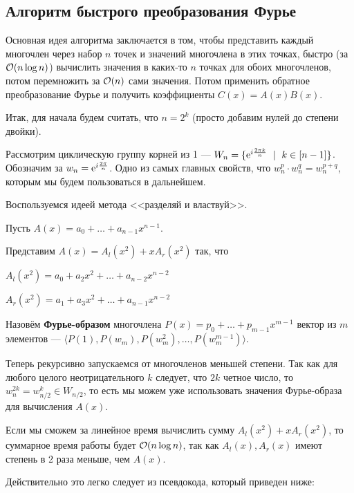 \subsection{Алгоритм быстрого преобразования Фурье}

Основная идея алгоритма заключается в том, чтобы представить каждый многочлен
через набор $n$ точек и значений многочлена в этих точках, быстро (за $\mathcal{O}(n\log n)$) вычислить значения в каких-то $n$ точках для обоих многочленов, потом
перемножить за $\mathcal{O}(n)$ сами значения. Потом применить обратное преобразование
Фурье и получить коэффициенты $C(x) = A(x)B(x)$.

Итак, для начала будем считать, что $n = 2^k$ (просто добавим нулей до степени двойки).

Рассмотрим циклическую группу корней из 1 --- $W_n = \{\e^{i\frac{2\pi k}{n}} \ 
\mid \ k \in [n - 1]\}$. Обозначим за $w_n = \mathrm{e}^{i\frac{2\pi}{n}}$.
Одно из самых главных свойств, что $w_n^{p} \cdot w_n^{q} = w_n^{p + q}$,
которым мы будем пользоваться в дальнейшем.

Воспользуемся идеей метода <<разделяй и властвуй>>.

Пусть $A(x) = a_0 + \ldots + a_{n - 1}x^{n - 1}$.

Представим $A(x) = A_l(x^2) + xA_r(x^2)$ так, что

\begin{center}
  $A_l(x^2) = a_0 + a_2x^2 + \ldots + a_{n - 2}x^{n - 2}$

  $A_r(x^2) = a_1 + a_3x^2 + \ldots + a_{n - 1}x^{n - 2}$
\end{center}

\begin{Def}
  Назовём \textbf{Фурье-образом} многочлена $P(x) = p_0 + \ldots + 
  p_{m - 1}x^{m - 1}$ вектор из $m$ элементов ---  $\langle P(1), P(w_m), P(w_m^2), \ldots, P(w_m^{m - 1}) \rangle$.
\end{Def}

Теперь рекурсивно запускаемся от многочленов меньшей степени. Так как для 
любого целого неотрицательного $k$ следует, что $2k$ четное число, то $w_n^{2k} = w_{n/2}^k \in W_{n/2}$,
то есть мы можем уже использовать значения Фурье-образа для вычисления $A(x)$.

Если мы сможем за линейное время вычислить сумму $A_l(x^2) + xA_r(x^2)$, то
суммарное время работы будет $\mathcal{O}(n\log n)$, так как $A_l(x), A_r(x)$ имеют степень
в 2 раза меньше, чем $A(x)$.

Действительно это легко следует из псевдокода, который приведен ниже:

